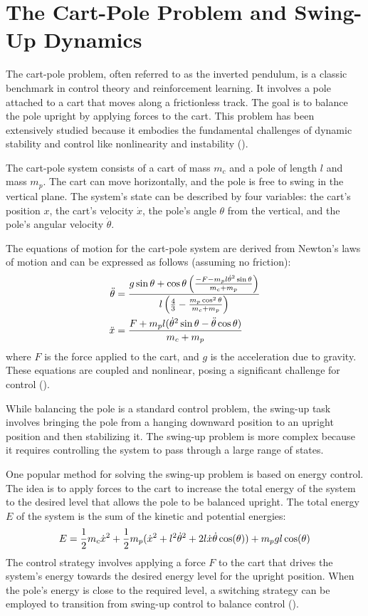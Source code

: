 \section{The Cart-Pole Problem and Swing-Up Dynamics}

The cart-pole problem, often referred to as the inverted pendulum, is a classic benchmark in control theory and reinforcement learning. It involves a pole attached to a cart that moves along a frictionless track. The goal is to balance the pole upright by applying forces to the cart. This problem has been extensively studied because it embodies the fundamental challenges of dynamic stability and control like nonlinearity and instability (\cite{kumari_root_2023}).

The cart-pole system consists of a cart of mass $m_c$ and a pole of length $l$ and mass $m_p$. The cart can move horizontally, and the pole is free to swing in the vertical plane. The system's state can be described by four variables: the cart's position $x$, the cart's velocity $\dot{x}$, the pole's angle $\theta$ from the vertical, and the pole's angular velocity $\dot{\theta}$.

The equations of motion for the cart-pole system are derived from Newton's laws of motion and can be expressed as follows (assuming no friction):
\begin{align}
\ddot{\theta} &= \frac{g\sin\theta + \cos\theta\left(\frac{-F-m_p l \dot{\theta}^2 \sin\theta}{m_c+m_p}\right)}{l\left(\frac{4}{3}-\frac{m_p \cos^2 \theta}{m_c+m_p}\right)} \notag \\
\ddot{x} &= \frac{F+m_p l (\dot{\theta}^2 \sin\theta - \ddot{\theta} \cos\theta)}{m_c+m_p} \notag
\end{align}
where $F$ is the force applied to the cart, and $g$ is the acceleration due to gravity. These equations are coupled and nonlinear, posing a significant challenge for control (\cite{florian_correct_2007}).

While balancing the pole is a standard control problem, the swing-up task involves bringing the pole from a hanging downward position to an upright position and then stabilizing it. The swing-up problem is more complex because it requires controlling the system to pass through a large range of states.

One popular method for solving the swing-up problem is based on energy control. The idea is to apply forces to the cart to increase the total energy of the system to the desired level that allows the pole to be balanced upright. The total energy $E$ of the system is the sum of the kinetic and potential energies:
\begin{align}
E = \frac{1}{2} m_c \dot{x}^2 + \frac{1}{2} m_p (\dot{x}^2 + l^2 \dot{\theta}^2 + 2 l \dot{x} \dot{\theta} \cos(\theta)) + m_p g l \cos(\theta) \notag
\end{align}
The control strategy involves applying a force $F$ to the cart that drives the system's energy towards the desired energy level for the upright position. When the pole's energy is close to the required level, a switching strategy can be employed to transition from swing-up control to balance control (\cite{astrom_swinging_2000}).


